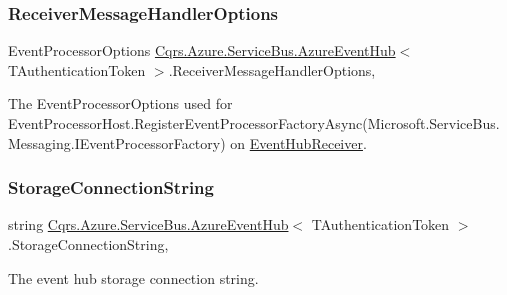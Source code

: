 \subsubsection{\texorpdfstring{Receiver\+Message\+Handler\+Options}{ReceiverMessageHandlerOptions}}
{\footnotesize\ttfamily Event\+Processor\+Options \hyperlink{classCqrs_1_1Azure_1_1ServiceBus_1_1AzureEventHub}{Cqrs.\+Azure.\+Service\+Bus.\+Azure\+Event\+Hub}$<$ T\+Authentication\+Token $>$.Receiver\+Message\+Handler\+Options\hspace{0.3cm}{\ttfamily [get]}, {\ttfamily [protected]}}



The Event\+Processor\+Options used for Event\+Processor\+Host.\+Register\+Event\+Processor\+Factory\+Async(\+Microsoft.\+Service\+Bus.\+Messaging.\+I\+Event\+Processor\+Factory) on \hyperlink{classCqrs_1_1Azure_1_1ServiceBus_1_1AzureEventHub_a1b12b47dbb9b9afe2014477a2e457c35_a1b12b47dbb9b9afe2014477a2e457c35}{Event\+Hub\+Receiver}. 

\mbox{\label{classCqrs_1_1Azure_1_1ServiceBus_1_1AzureEventHub_a2b102538e8b72f9990578fa3bcbe4c12_a2b102538e8b72f9990578fa3bcbe4c12}} 
\subsubsection{\texorpdfstring{Storage\+Connection\+String}{StorageConnectionString}}
{\footnotesize\ttfamily string \hyperlink{classCqrs_1_1Azure_1_1ServiceBus_1_1AzureEventHub}{Cqrs.\+Azure.\+Service\+Bus.\+Azure\+Event\+Hub}$<$ T\+Authentication\+Token $>$.Storage\+Connection\+String\hspace{0.3cm}{\ttfamily [get]}, {\ttfamily [protected]}}



The event hub storage connection string. 

\mbox{\label{classCqrs_1_1Azure_1_1ServiceBus_1_1AzureEventHub_a4cf19edac088c5ea74408398b3dfd4a2_a4cf19edac088c5ea74408398b3dfd4a2}} 
